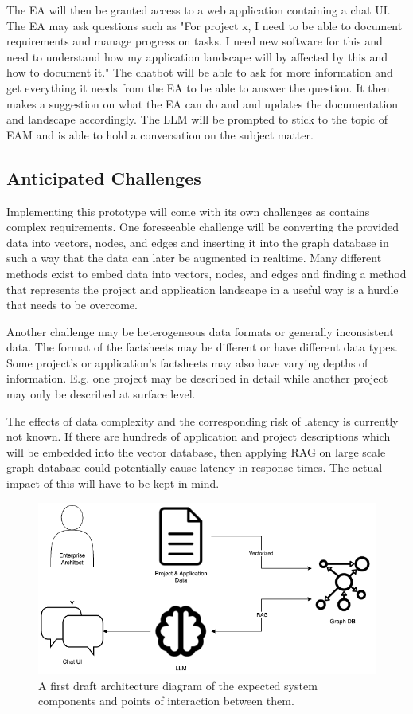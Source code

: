 \documentclass[english]{lni}
\begin{document}
The EA will then be granted access to a web application containing a chat UI. The EA may ask questions such as "For project x, I need to be able to document requirements and manage progress on tasks. I need new software for this and need to understand how my application landscape will by affected by this and how to document it." The chatbot will be able to ask for more information and get everything it needs from the EA to be able to answer the question. It then makes a suggestion on what the EA can do and and updates the documentation and landscape accordingly. The LLM will be prompted to stick to the topic of EAM and is able to hold a conversation on the subject matter.

\subsection{Anticipated Challenges}
Implementing this prototype will come with its own challenges as contains complex requirements. One foreseeable challenge will be converting the provided data into vectors, nodes, and edges and inserting it into the graph database in such a way that the data can later be augmented in realtime. Many different methods exist to embed data into vectors, nodes, and edges and finding a method that represents the project and application landscape in a useful way is a hurdle that needs to be overcome.\cite{grohe2020word2vec}

Another challenge may be heterogeneous data formats or generally inconsistent data. The format of the factsheets may be different or have different data types. Some project's or application's factsheets may also have varying depths of information. E.g. one project may be described in detail while another project may only be described at surface level.

The effects of data complexity and the corresponding risk of latency is currently not known. If there are hundreds of application and project descriptions which will be embedded into the vector database, then applying RAG on large scale graph database could potentially cause latency in response times. The actual impact of this will have to be kept in mind.


\begin{figure}[h]
\centering
\includegraphics[scale=0.5]{./architecture_diagram.png}
\caption{A first draft architecture diagram of the expected system components and points of interaction between them.}
\label{fig:arch_diagram}
\end{figure}
\end{document}
